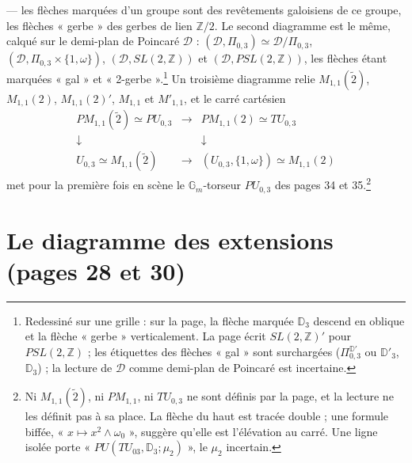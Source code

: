\documentclass[11pt,a4paper]{article}
\begin{document}
— les flèches marquées d'un groupe sont des revêtements galoisiens de ce groupe,
les flèches « gerbe » des gerbes de lien $\mathbb{Z}/2$. Le second diagramme est
le même, calqué sur le demi-plan de Poincaré $\mathcal{D}$ : $(\mathcal{D},
\Pi_{0,3}) \simeq \mathcal{D}/\Pi_{0,3}$, $(\mathcal{D}, \Pi_{0,3} \times \{1,
\omega\})$, $(\mathcal{D}, SL(2, \mathbb{Z}))$ et $(\mathcal{D}, PSL(2,
\mathbb{Z}))$, les flèches étant marquées « gal » et
« 2-gerbe ».\footnote{Redessiné sur une grille : sur la page, la flèche marquée
$\mathbb{D}_3$ descend en oblique et la flèche « gerbe » verticalement. La page
écrit $SL(2, \mathbb{Z})'$ pour $PSL(2, \mathbb{Z})$ ; les étiquettes des
flèches « gal » sont surchargées ($\Pi^{\mathbb{D}'}_{0,3}$ ou $\mathbb{D}'_3$,
$\mathbb{D}_3$) ; la lecture de $\mathcal{D}$ comme demi-plan de Poincaré est
incertaine.} Un troisième diagramme relie $M_{1,1}(\tilde 2)$, $M_{1,1}(2)$,
$M_{1,1}(2)'$, $M_{1,1}$ et $M'_{1,1}$, et le carré cartésien
\[
\begin{array}{ccc}
PM_{1,1}(\tilde 2) \simeq PU_{0,3} & \longrightarrow & PM_{1,1}(2) \simeq TU_{0,3} \\
\downarrow & & \downarrow \\
U_{0,3} \simeq M_{1,1}(\tilde 2) & \longrightarrow & (U_{0,3}, \{1, \omega\}) \simeq M_{1,1}(2)
\end{array}
\]
met pour la première fois en scène le $\mathbb{G}_m$-torseur $PU_{0,3}$ des
pages 34 et 35.\footnote{Ni $M_{1,1}(\tilde 2)$, ni $PM_{1,1}$, ni $TU_{0,3}$ ne
sont définis par la page, et la lecture ne les définit pas à sa place. La flèche
du haut est tracée double ; une formule biffée, « $x \mapsto x^2 \wedge
\omega_0$ », suggère qu'elle est l'élévation au carré. Une ligne isolée porte
« $PU(TU_{03}, \mathbb{D}_3; \mu_2)$ », le $\mu_2$ incertain.}

\section*{Le diagramme des extensions (pages 28 et 30)}
\end{document}
